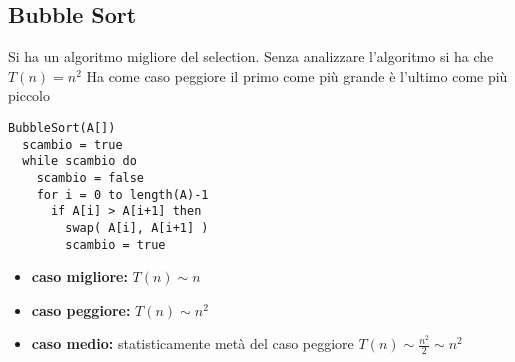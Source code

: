 \documentclass[a4paper,12pt,oneside,tikz]{book}
\begin{document}
\subsection{Bubble Sort}
Si ha un algoritmo migliore del selection. Senza analizzare l'algoritmo si ha che $T(n)=n^2$
Ha come caso peggiore il primo come più grande è l'ultimo come più piccolo
\begin{verbatim}
BubbleSort(A[])
  scambio = true
  while scambio do
    scambio = false
    for i = 0 to length(A)-1  
      if A[i] > A[i+1] then
        swap( A[i], A[i+1] )
        scambio = true
\end{verbatim}
\begin{itemize}
\item \textbf{caso migliore:} $T(n)\sim n$
\item \textbf{caso peggiore:} $T(n)\sim n^2$
\item \textbf{caso medio:} statisticamente metà del caso peggiore $T(n)\sim\frac{n^2}{2}\sim n^2$
\end{itemize}
\newpage
\end{document}
